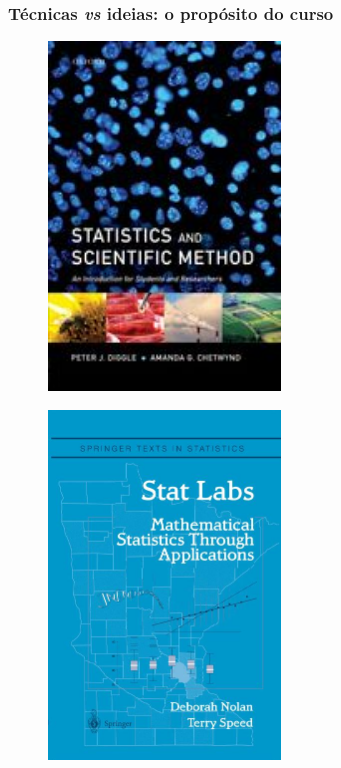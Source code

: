 \documentclass[handout,serif, professionalfont, usenames, dvipsnames, aspectratio = 169]{beamer}\usepackage[]{graphicx}\usepackage[]{color}
\begin{document}
  
\begin{frame}
  \frametitle{Técnicas {\it vs} ideias: o propósito do curso}
  
\begin{figure}
\centering
\begin{minipage}{.5\textwidth}
  \centering
  \includegraphics[width=0.55\textwidth]{./pics/diggle+chetwynd.jpg}
  \label{fig:diggle+chetwynd}
\end{minipage}%
\begin{minipage}{.5\textwidth}
  \centering
  \includegraphics[width=0.55\textwidth]{./pics/statLabs.jpg}
  \label{fig:nolan+speed}
\end{minipage}
\nocite{nolan+speed:2000,diggle+chetwynd:2011}
\end{figure}

\end{frame}
\end{document}
